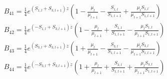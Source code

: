 \documentclass[%
 reprint,
 amsmath,
 amssymb,
 aps,
 prl,
 lengthcheck,%
]{revtex4-1}
\begin{document}
\begin{table}
\begin{equation}
\begin{array}{l}
  B_{41} = \frac{1}{4} e^{(S_{1,l} + S_{3,l+1})z}\left( 1 - \frac{\mu_l}{\mu_{l+1}} - \frac{S_{1,l}}{S_{1,l+1}} + \frac{\mu_l S_{1,l}}{\mu_{l+1} S_{1,l+1}} \right)\\
  B_{42} = \frac{1}{4} e^{(-S_{1,l} + S_{3,l+1})z}\left( 1 - \frac{\mu_l}{\mu_{l+1}} + \frac{S_{1,l}}{S_{1,l+1}} - \frac{\mu_l S_{1,l}}{\mu_{l+1} S_{1,l+1}} \right)\\
  B_{43} = \frac{1}{4} e^{(S_{3,l} + S_{3,l+1})z}\left( 1 + \frac{\mu_l}{\mu_{l+1}} - \frac{S_{3,l}}{S_{1,l+1}} - \frac{\mu_l S_{3,l}}{\mu_{l+1} S_{1,l+1}} \right)\\
  B_{44} = \frac{1}{4} e^{(-S_{3,l} + S_{3,l+1})z}\left( 1 + \frac{\mu_l}{\mu_{l+1}} + \frac{S_{3,l}}{S_{1,l+1}} + \frac{\mu_l S_{3,l}}{\mu_{l+1} S_{1,l+1}} \right)\\[1em]
  
\end{array}\nonumber
\end{equation}
\label{B_components}
\end{table}
\end{document}
